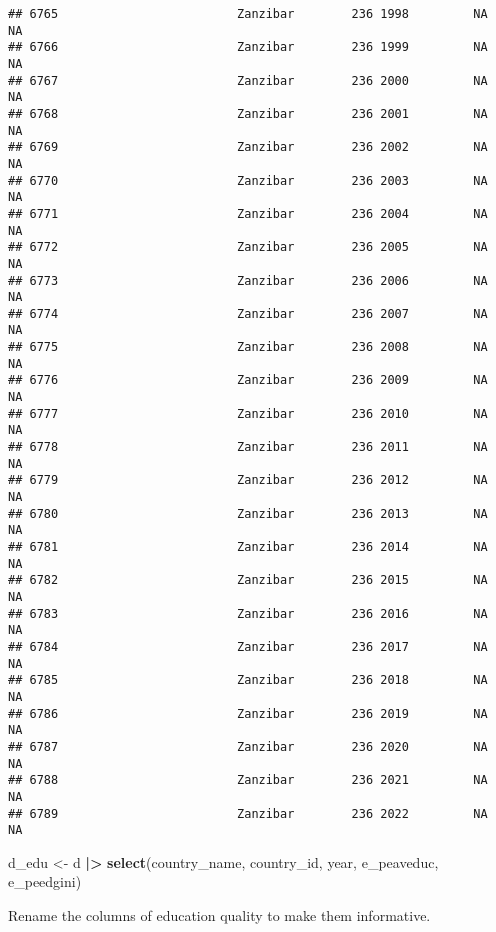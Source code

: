 \documentclass[
]{article}
\newenvironment{Shaded}{\begin{snugshade}}{\end{snugshade}}
\newcommand{\FunctionTok}[1]{\textcolor[rgb]{0.13,0.29,0.53}{\textbf{#1}}}
\newcommand{\NormalTok}[1]{#1}
\newcommand{\OtherTok}[1]{\textcolor[rgb]{0.56,0.35,0.01}{#1}}
\newcommand{\SpecialCharTok}[1]{\textcolor[rgb]{0.81,0.36,0.00}{\textbf{#1}}}
\begin{document}
\begin{verbatim}
## 6765                         Zanzibar        236 1998         NA         NA
## 6766                         Zanzibar        236 1999         NA         NA
## 6767                         Zanzibar        236 2000         NA         NA
## 6768                         Zanzibar        236 2001         NA         NA
## 6769                         Zanzibar        236 2002         NA         NA
## 6770                         Zanzibar        236 2003         NA         NA
## 6771                         Zanzibar        236 2004         NA         NA
## 6772                         Zanzibar        236 2005         NA         NA
## 6773                         Zanzibar        236 2006         NA         NA
## 6774                         Zanzibar        236 2007         NA         NA
## 6775                         Zanzibar        236 2008         NA         NA
## 6776                         Zanzibar        236 2009         NA         NA
## 6777                         Zanzibar        236 2010         NA         NA
## 6778                         Zanzibar        236 2011         NA         NA
## 6779                         Zanzibar        236 2012         NA         NA
## 6780                         Zanzibar        236 2013         NA         NA
## 6781                         Zanzibar        236 2014         NA         NA
## 6782                         Zanzibar        236 2015         NA         NA
## 6783                         Zanzibar        236 2016         NA         NA
## 6784                         Zanzibar        236 2017         NA         NA
## 6785                         Zanzibar        236 2018         NA         NA
## 6786                         Zanzibar        236 2019         NA         NA
## 6787                         Zanzibar        236 2020         NA         NA
## 6788                         Zanzibar        236 2021         NA         NA
## 6789                         Zanzibar        236 2022         NA         NA
\end{verbatim}

\begin{Shaded}
\begin{Highlighting}[]
\NormalTok{d\_edu }\OtherTok{\textless{}{-}}\NormalTok{ d }\SpecialCharTok{|\textgreater{}} \FunctionTok{select}\NormalTok{(country\_name, country\_id, year, e\_peaveduc, e\_peedgini)}
\end{Highlighting}
\end{Shaded}

Rename the columns of education quality to make them informative.
\end{document}
